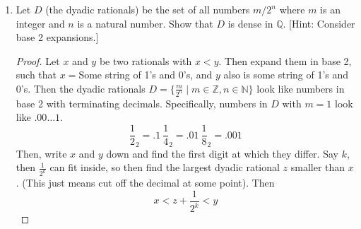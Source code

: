\documentclass[hidelinks,12pt]{article}
\renewcommand{\geq}{\geqslant}
\renewcommand{\leq}{\leqslant}
\newcommand{\N}{\mathbb{N}}
\newcommand{\Z}{\mathbb{Z}}
\newcommand{\Q}{\mathbb{Q}}
\begin{document}
\begin{enumerate}
  \begin{proof}[Proof]
    Fix $a,b\in\Q$ with $a<b$. By definition we have $a=\frac{x}{y}$ for $x,y\in\Z$ and $y\neq0$ and $b=\frac{w}{z}$.Then consider $b-a=\frac{p}{q}$ for integers $p,q$ (by closure), then we have $b-a=\frac{p}{q}\geq\frac{1}{q}>\frac{1}{10^n}$ for some $n\in\N$. So there is some $n$ such that $\frac{1}{10^n}<b-a$. Then, let $X=\{\frac{k}{10^n}|k\in\Z,n\in\N\}$. Elements of $X$ are finite decimal expansions, and there is a largest $c\in X$ such that $c\leq a$. Then, simply add $c+\frac{1}{10^n}$ (Choose the $n$ you need). Then $a<c+\frac{1}{10^n}<b$.
  \end{proof}
\item Let $D$ (the dyadic rationals) be the set of all numbers $m / 2^n$ where $m$ is an integer and $n$ is a natural number. Show that $D$ is dense in $\mathbb{Q}$. [Hint: Consider base 2 expansions.]
  \begin{proof}
    Let $x$ and $y$ be two rationals with $x<y$. Then expand them in base 2, such that $x=$Some string of 1's and 0's, and $y$ also is some string of 1's and 0's. Then the dyadic rationals $D=\{\frac{m}{2^n}\mid m\in\Z, n\in\N\}$ look like numbers in base 2 with terminating decimals. Specifically, numbers in $D$ with $m=1$ look like $.00\dots1$. \[\frac{1}{2}_2=.1\ \frac{1}{4}_2=.01\ \frac{1}{8}_2=.001\] Then, write $x$ and $y$ down and find the first digit at which they differ. Say $k$, then $\frac{1}{2^k}$ can fit inside, so then find the largest dyadic rational $z$ smaller than $x$. (This just means cut off the decimal at some point). Then \[x<z+\frac{1}{2^k}<y\]
  \end{proof}
  

\end{enumerate}
\end{document}
